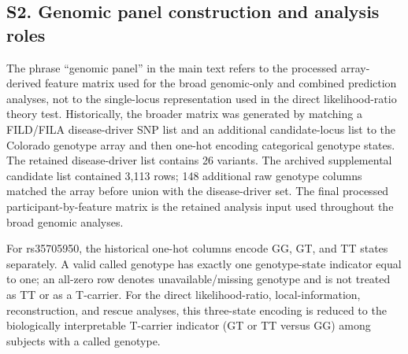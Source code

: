 \subsection*{S2. Genomic panel construction and analysis roles}
The phrase ``genomic panel'' in the main text refers to the processed array-derived feature matrix used for the broad genomic-only and combined prediction analyses, not to the single-locus representation used in the direct likelihood-ratio theory test. Historically, the broader matrix was generated by matching a FILD/FILA disease-driver SNP list and an additional candidate-locus list to the Colorado genotype array and then one-hot encoding categorical genotype states. The retained disease-driver list contains 26 variants. The archived supplemental candidate list contained 3,113 rows; 148 additional raw genotype columns matched the array before union with the disease-driver set. The final processed participant-by-feature matrix is the retained analysis input used throughout the broad genomic analyses.

For rs35705950, the historical one-hot columns encode GG, GT, and TT states separately. A valid called genotype has exactly one genotype-state indicator equal to one; an all-zero row denotes unavailable/missing genotype and is not treated as TT or as a T-carrier. For the direct likelihood-ratio, local-information, reconstruction, and rescue analyses, this three-state encoding is reduced to the biologically interpretable T-carrier indicator (GT or TT versus GG) among subjects with a called genotype.

